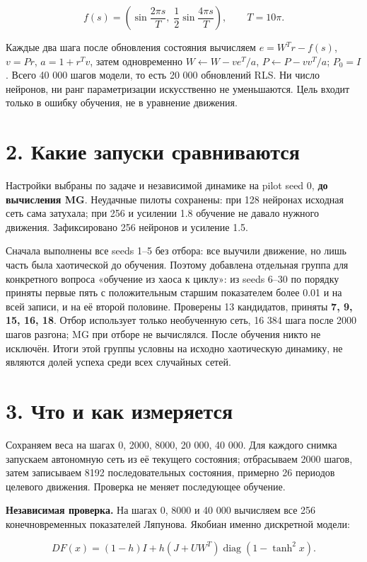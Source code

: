 \documentclass[10pt,a4paper]{article}
\begin{document}
\[
f(s)=\left(\sin\frac{2\pi s}{T},\;\frac12\sin\frac{4\pi s}{T}\right),\qquad T=10\pi.
\]

Каждые два шага после обновления состояния вычисляем $e=W^Tr-f(s)$, $v=Pr$, $a=1+r^Tv$, затем одновременно $W\leftarrow W-ve^T/a$, $P\leftarrow P-vv^T/a$; $P_0=I$. Всего 40 000 шагов модели, то есть 20 000 обновлений RLS. Ни число нейронов, ни ранг параметризации искусственно не уменьшаются. Цель входит только в ошибку обучения, не в уравнение движения.

\section*{2. Какие запуски сравниваются}

Настройки выбраны по задаче и независимой динамике на pilot seed 0, \textbf{до вычисления MG}. Неудачные пилоты сохранены: при 128 нейронах исходная сеть сама затухала; при 256 и усилении 1.8 обучение не давало нужного движения. Зафиксировано 256 нейронов и усиление 1.5.

Сначала выполнены все seeds 1--5 без отбора: все выучили движение, но лишь часть была хаотической до обучения. Поэтому добавлена отдельная группа для конкретного вопроса «обучение из хаоса к циклу»: из seeds 6--30 по порядку приняты первые пять с положительным старшим показателем более 0.01 и на всей записи, и на её второй половине. Проверены 13 кандидатов, приняты \textbf{7, 9, 15, 16, 18}. Отбор использует только необученную сеть, 16 384 шага после 2000 шагов разгона; MG при отборе не вычислялся. После обучения никто не исключён. Итоги этой группы условны на исходно хаотическую динамику, не являются долей успеха среди всех случайных сетей.

\newpage

\section*{3. Что и как измеряется}

Сохраняем веса на шагах 0, 2000, 8000, 20 000, 40 000. Для каждого снимка запускаем автономную сеть из её текущего состояния; отбрасываем 2000 шагов, затем записываем 8192 последовательных состояния, примерно 26 периодов целевого движения. Проверка не меняет последующее обучение.

\textbf{Независимая проверка.} На шагах 0, 8000 и 40 000 вычисляем все 256 конечновременных показателей Ляпунова. Якобиан именно дискретной модели:

\[
D F(x)=(1-h)I+h(J+UW^T)\operatorname{diag}(1-\tanh^2x).
\]
\end{document}
